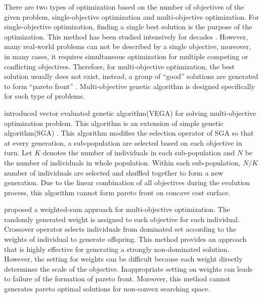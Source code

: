 There are two types of optimization based on the number of objectives of the given problem, single-objective optimization and multi-objective optimization. For single-objective optimization, finding a single best solution is the purpose of the optimization. This method has been studied intensively for decades . However, many real-world problems can not be described by a single objective, moreover, in many cases, it requires simultaneous optimization for multiple competing or conflicting objectives. Therefore, for multi-objective optimization, the best solution usually does not exist, instead, a group of ``good'' solutions are generated to form ``pareto front'' .  Multi-objective genetic algorithm is designed specifically for such type of problems. 

 introduced vector evaluated genetic algorithm(VEGA) for solving multi-objective optimization problem. This algorithm is an extension of simple genetic algorithm(SGA) . This algorithm modifies the selection operator of SGA so that at every generation, a sub-population are selected based on each objective in turn. Let $K$ denotes the number of individuals in each sub-population and $N$ be the number of individuals in whole population. Within each sub-population, $N/K$ number of individuals are selected and shuffled together to form a new generation. Due to the linear combination of all objectives during the evolution process, this algorithm cannot form pareto front on concave cost surface. 

 proposed a weighted-sum approach for multi-objective optimization. The randomly generated weight is assigned to each objective for each individual. Crossover operator selects individuals from dominated set according to the weights of individual to generate offspring. This method provides an approach that is highly effective for generating a strongly non-dominated solution. However, the setting for weights can be difficult because each weight directly determines the scale of the objective. Inappropriate setting on weights can leads to failure of  the formation of pareto front. Moreover, this method cannot generates pareto optimal solutions for non-convex searching space. 


